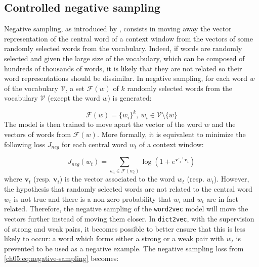   \subsection{Controlled negative sampling}
    \label{ch05:subsec:controlled-negative-sampling}
    Negative sampling, as introduced by \citet{mikolov2013efficient}, consists
    in moving away the vector representation of the central word of a context
    window from the vectors of some randomly selected words from the vocabulary.
    Indeed, if words are randomly selected and given the large size of the
    vocabulary, which can be composed of hundreds of thousands of words, it is
    likely that they are not related so their word representations should be
    dissimilar. In negative sampling, for each word $w$ of the vocabulary
    $\mathcal{V}$, a set $\mathcal{F}(w)$ of $k$ randomly selected words from
    the vocabulary $\mathcal{V}$ (except the word $w$) is generated:

    \begin{equation}
      \mathcal{F}(w) = {\{w_i\}}^k, ~w_i \in \mathcal{V} \setminus \{w\}
    \end{equation}
    The model is then trained to move apart the vector of the word $w$ and the
    vectors of words from $\mathcal{F}(w)$. More formally, it is equivalent to
    minimize the following loss $J_{neg}$ for each central word $w_t$ of a
    context window:

    \begin{equation}
    \label{ch05:eq:negative-sampling}
      J_{neg}(w_t) = \sum_{w_i \in \mathcal{F}(w_t)}
                     \log(1 + e^{\mathbf{v'}_{i} {}^\top \mathbf{v}_{t}})
    \end{equation}
    where $\mathbf{v}_t$ (resp. $\mathbf{v}_i$) is the vector associated to the
    word $w_t$ (resp. $w_i$). However, the hypothesis that randomly selected
    words are not related to the central word $w_t$ is not true and there is a
    non-zero probability that $w_i$ and $w_t$ are in fact related. Therefore,
    the negative sampling of the \texttt{word2vec} model will move the vectors
    further instead of moving them closer. In \texttt{dict2vec}, with the
    supervision of strong and weak pairs, it becomes possible to better ensure
    that this is less likely to occur: a word which forms either a strong or a
    weak pair with $w_t$ is prevented to be used as a negative example. The
    negative sampling loss from \autoref{ch05:eq:negative-sampling} becomes:

